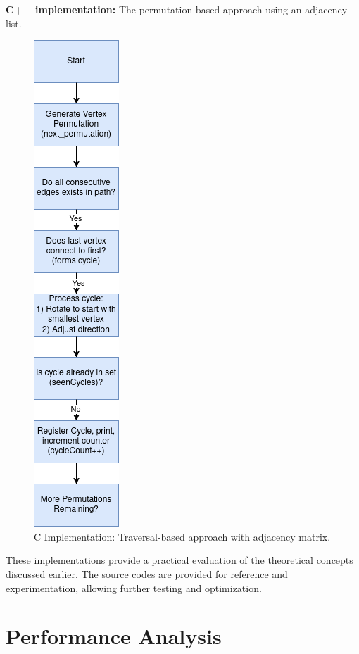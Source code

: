 \documentclass{sbc2023}%
\begin{document}
\textbf{C++ implementation:} The permutation-based approach using an adjacency list.

\begin{figure}[H] %
    \centering
    \includegraphics[width=0.2\columnwidth]{Permutacao.png}  
    \caption{C Implementation: Traversal-based approach with adjacency matrix.}
    \label{fig:cpp_impl}
\end{figure}


These implementations provide a practical evaluation of the theoretical concepts discussed earlier. The source codes are provided for reference and experimentation, allowing further testing and optimization.

\section{Performance Analysis}
\end{document}
